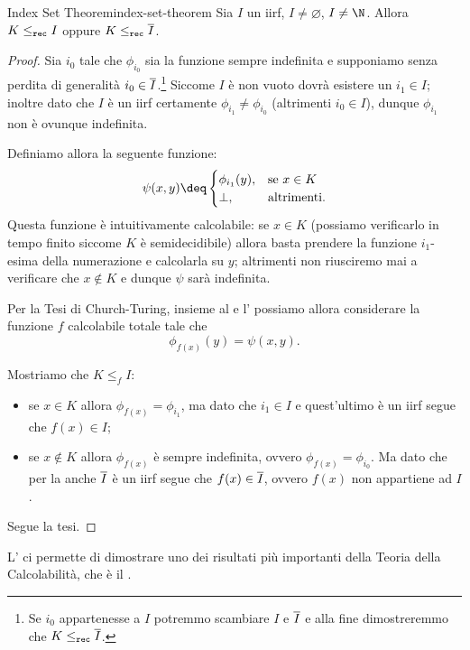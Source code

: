 \begin{theorem}
    {Index Set Theorem}{index-set-theorem}
    Sia $I$ un iirf, $I \neq \varnothing$, $I \neq \N$. Allora $K \leq_{\texttt{rec}} I$ oppure $K \leq_{\texttt{rec}} \overline{I}$.   
\end{theorem}
\begin{proof}
    Sia $i_0$ tale che $\phi_{i_0}$ sia la funzione sempre indefinita e supponiamo senza perdita di generalità $i_0 \in \overline{I}$.\footnote{Se $i_0$ appartenesse a $I$ potremmo scambiare $I$ e $\overline{I}$ e alla fine dimostreremmo che $K \leq_{\texttt{rec}} \overline{I}$.} Siccome $I$ è non vuoto dovrà esistere un $i_1 \in I$; inoltre dato che $I$ è un iirf certamente $\phi_{i_1} \neq \phi_{i_0}$ (altrimenti $i_0 \in I$), dunque $\phi_{i_1}$ non è ovunque indefinita.  

    Definiamo allora la seguente funzione: \[
        \psi(x, y) \deq \begin{cases}
            \phi_{i_1}(y),  &\text{se } x \in K\\
            \bot,           &\text{altrimenti.}
        \end{cases}
    \] Questa funzione è intuitivamente calcolabile: se $x \in K$ (possiamo verificarlo in tempo finito siccome $K$ è semidecidibile) allora basta prendere la funzione $i_1$-esima della numerazione e calcolarla su $y$; altrimenti non riusciremo mai a verificare che $x \notin K$ e dunque $\psi$ sarà indefinita.
    
    Per la Tesi di Church-Turing, insieme al  e l' possiamo allora considerare la funzione $f$ calcolabile totale tale che \[
        \phi_{f(x)}(y) = \psi(x, y).
    \]

    Mostriamo che $K \leq_f I$: \begin{itemize}
        \item se $x \in K$ allora $\phi_{f(x)} = \phi_{i_1}$, ma dato che $i_1 \in I$ e quest'ultimo è un iirf segue che $f(x) \in I$;
        \item se $x \notin K$ allora $\phi_{f(x)}$ è sempre indefinita, ovvero $\phi_{f(x)} = \phi_{i_0}$. Ma dato che per la  anche $\overline{I}$ è un iirf segue che $f(x) \in \overline{I}$, ovvero $f(x)$ non appartiene ad $I$.   
    \end{itemize} 
    Segue la tesi.
\end{proof}

L' ci permette di dimostrare uno dei risultati più importanti della Teoria della Calcolabilità, che è il .

